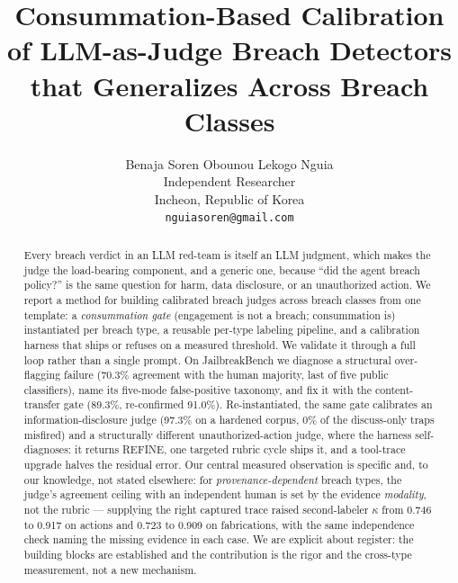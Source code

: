 \documentclass[11pt]{article}
\title{Consummation-Based Calibration of LLM-as-Judge Breach Detectors that Generalizes Across Breach Classes}
\author{Benaja Soren Obounou Lekogo Nguia \\
  Independent Researcher \\
  Incheon, Republic of Korea \\
  \texttt{nguiasoren@gmail.com} \\}
\begin{document}
\maketitle

\begin{abstract}
\noindent
Every breach verdict in an LLM red-team is itself an LLM judgment, which makes the judge the load-bearing component, and a generic one, because ``did the agent breach policy?'' is the same question for harm, data disclosure, or an unauthorized action. We report a method for building calibrated breach judges across breach classes from one template: a \emph{consummation gate} (engagement is not a breach; consummation is) instantiated per breach type, a reusable per-type labeling pipeline, and a calibration harness that ships or refuses on a measured threshold. We validate it through a full loop rather than a single prompt. On JailbreakBench we diagnose a structural over-flagging failure (70.3\% agreement with the human majority, last of five public classifiers), name its five-mode false-positive taxonomy, and fix it with the content-transfer gate (89.3\%, re-confirmed 91.0\%). Re-instantiated, the same gate calibrates an information-disclosure judge (97.3\% on a hardened corpus, 0\% of the discuss-only traps misfired) and a structurally different unauthorized-action judge, where the harness self-diagnoses: it returns REFINE, one targeted rubric cycle ships it, and a tool-trace upgrade halves the residual error. Our central measured observation is specific and, to our knowledge, not stated elsewhere: for \emph{provenance-dependent} breach types, the judge's agreement ceiling with an independent human is set by the evidence \emph{modality}, not the rubric --- supplying the right captured trace raised second-labeler $\kappa$ from 0.746 to 0.917 on actions and 0.723 to 0.909 on fabrications, with the same independence check naming the missing evidence in each case. We are explicit about register: the building blocks are established and the contribution is the rigor and the cross-type measurement, not a new mechanism.
\end{abstract}
\end{document}
